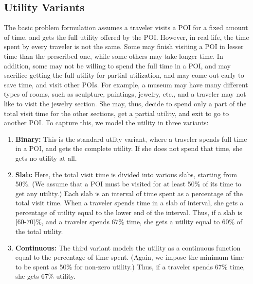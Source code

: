 \subsection{Utility Variants}
\label{sec:utility}

The basic problem formulation assumes a traveler visits a POI for a fixed amount of time, and gets the full utility offered by the POI.
However, in real life, the time spent by every traveler is not the same.
Some may finish visiting a POI in lesser time than the prescribed one, while some others may take longer time.
In addition, some may not be willing to spend the full time in a POI, and may sacrifice getting the full utility for partial utilization, and may come out early to save time, and visit other POIs.
For example, a museum may have many different types of rooms, such as sculpture, paintings, jewelry, etc., and a traveler may not like to visit the jewelry section.
She may, thus, decide to spend only a part of the total visit time for the other sections, get a partial utility, and exit to go to another POI.
To capture this, we model the utility in three variants:

\begin{enumerate}

	\item \textbf{Binary:} This is the standard utlity variant, where a
		traveler spends full time in a POI, and gets the complete utility.
		If she does not spend that time, she gets no utility at all. 

	\item \textbf{Slab:} Here, the total visit time is divided into various
		slabs, starting from 50\%.  (We assume that a POI must be visited
		for at least 50\% of its time to get any utility.) Each slab is an
		interval of time spent as a percentage of the total visit time.
		When a traveler spends time in a slab of interval, she gets a
		percentage of utility equal to the lower end of the interval.
		Thus, if a slab is [60-70)\%, and a traveler spends 67\% time, she
		gets a utility equal to 60\% of the total utility.

	\item \textbf{Continuous:} The third variant models the utility as a
		continuous function equal to the percentage of time spent.  (Again,
		we impose the minimum time to be spent as 50\% for non-zero
		utility.) Thus, if a traveler spends 67\% time, she gets 67\%
		utility.

\end{enumerate}

